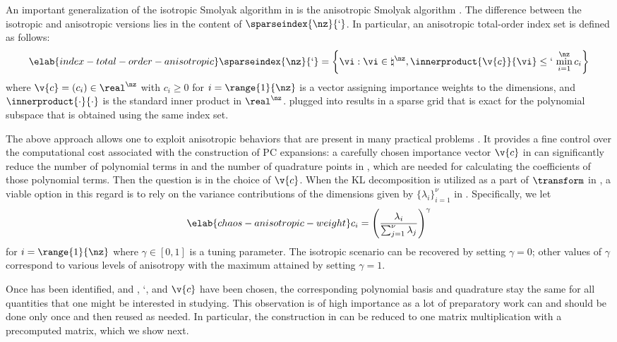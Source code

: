 An important generalization of the isotropic Smolyak algorithm in
 is the anisotropic Smolyak algorithm \cite{nobile2008}.
The difference between the isotropic and anisotropic versions lies in the
content of $\sparseindex{\nz}{\lq}$. In particular, an anisotropic total-order
index set is defined as follows:
\begin{equation} \elab{index-total-order-anisotropic}
  \sparseindex{\nz}{\lq} = \left\{ \vi: \vi \in \natural^\nz, \innerproduct{\v{c}}{\vi} \leq \lq \, \min_{i = 1}^\nz c_i \right\}
\end{equation}
where $\v{c} = (c_i) \in \real^\nz$ with $c_i \geq 0$ for $i = \range{1}{\nz}$
is a vector assigning importance weights to the dimensions, and
$\innerproduct{\cdot}{\cdot}$ is the standard inner product in $\real^\nz$.
 plugged into 
results in a sparse grid that is exact for the polynomial subspace that is
obtained using the same index set.

The above approach allows one to exploit anisotropic behaviors that are present
in many practical problems \cite{nobile2008}. It provides a fine control over
the computational cost associated with the construction of \ac{PC} expansions: a
carefully chosen importance vector $\v{c}$ in
 can significantly reduce the number of
polynomial terms in  and the number of quadrature points
in , which are needed for calculating the coefficients
of those polynomial terms. Then the question is in the choice of $\v{c}$. When
the \ac{KL} decomposition is utilized as a part of $\transform$ in
, a viable option in this regard is to rely on the
variance contributions of the dimensions given by $\{ \lambda_i \}_{i = 1}^\nu$
in . Specifically, we let
\begin{equation} \elab{chaos-anisotropic-weight}
  c_i = \left(\frac{\lambda_i}{\sum_{j = 1}^\nu \lambda_j}\right)^\gamma
\end{equation}
for $i = \range{1}{\nz}$ where $\gamma \in [0, 1]$ is a tuning parameter. The
isotropic scenario can be recovered by setting $\gamma = 0$; other values of
$\gamma$ correspond to various levels of anisotropy with the maximum attained by
setting $\gamma = 1$.

Once \vz has been identified, and \lc, \lq, and $\v{c}$ have been chosen, the
corresponding polynomial basis and quadrature stay the same for all quantities
that one might be interested in studying. This observation is of high importance
as a lot of preparatory work can and should be done only once and then reused as
needed. In particular, the construction in  can be reduced
to one matrix multiplication with a precomputed matrix, which we show next.

